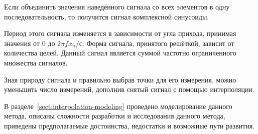 Если объединить значения наведённого сигнала со всех элементов в одну последовательность, 
то получится сигнал комплексной синусоиды.

Период этого сигнала изменяется в зависимости от угла прихода, принимая значения от $0$ до $2\pi fx_n/с$.
Форма сигнала, принятого решёткой, зависит от количества целей. Данный сигнал является суммой частотно ограниченного множества сигналов. 

Зная природу сигнала и правильно выбрав точки для его измерения, можно уменьшить число измерений, 
дополнив снятый сигнал с помощью интерполяции.

В разделе~\ref{sect:interpolation-modeling} проведено моделирование данного метода, 
описаны сложности разработки и исследования данного метода, приведены предполагаемые достоинства, 
недостатки и возможные пути развития.

